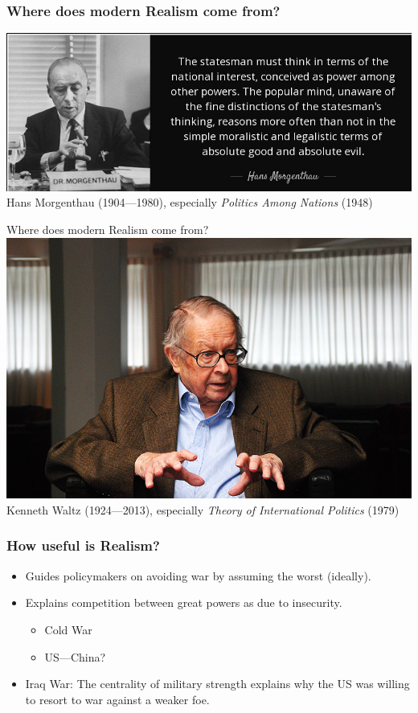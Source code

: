 \documentclass{beamer}
\begin{document}
\begin{frame} 
\frametitle{\LARGE{Where does modern Realism come from?}}
    \centering
\includegraphics[width=\textwidth,height=0.8\textheight,keepaspectratio]{morgenthau.jpg}
Hans Morgenthau (1904---1980), especially \textit{Politics Among Nations} (1948)
\end{frame}

\begin{frame}{\LARGE Where does modern Realism come from?}
    \centering
\includegraphics[width=\textwidth,height=0.8\textheight,keepaspectratio]{waltz.jpg}
Kenneth Waltz (1924---2013), especially \textit{Theory of International Politics} (1979)
\end{frame}

\begin{frame} 
\frametitle{\LARGE{How useful is Realism?}}
    \begin{itemize}
        \item Guides policymakers on avoiding war by assuming the worst (ideally). \pause
        \item Explains competition between great powers as due to insecurity. \pause
        \begin{itemize}
            \item Cold War \pause
            \item US---China? \pause
        \end{itemize}
        \item Iraq War: The centrality of military strength explains why the US was willing to resort to war against a weaker foe.
    \end{itemize}
\end{frame}
\end{document}
